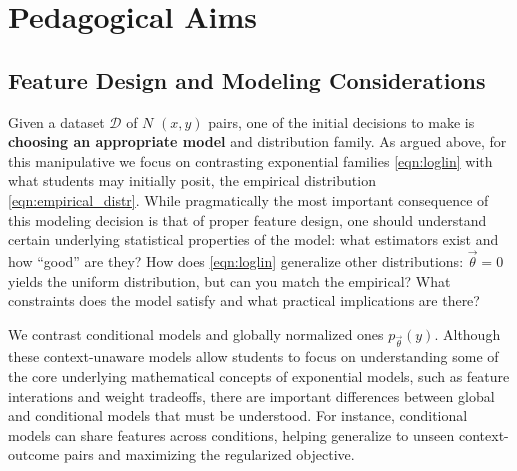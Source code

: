 \documentclass[11pt,letterpaper]{article}
\newcommand{\Data}[0]{\ensuremath{\mathcal{D}}}
\begin{document}

%
%
%


\section{Pedagogical Aims}\label{sec:aims}

\subsection{Feature Design and Modeling Considerations}

Given a dataset $\Data{}$ of $N$ $(x, y)$ pairs, one of the initial decisions 
to make is \textbf{choosing an appropriate model} and distribution family. 
As argued above, for this manipulative we focus on contrasting exponential families 
\eqref{eqn:loglin} with what students may initially posit, the empirical 
distribution \eqref{eqn:empirical_distr}. While pragmatically the most important 
consequence of this modeling decision is that of proper feature design, one should 
understand certain underlying statistical properties of the model: what estimators 
exist and how ``good'' are they? How does \eqref{eqn:loglin} generalize other 
distributions: $\vec{\theta} = 0$ yields the uniform distribution, but can you match 
the empirical? What constraints does the model satisfy and what practical implications
are there?
 
We contrast conditional models and globally normalized ones
$p_{\vec{\theta}}\left(y\right)$. Although
these context-unaware models allow students to focus on
understanding some of the core underlying mathematical concepts of
exponential models, such as feature interations and weight tradeoffs,
there are important differences between global and conditional models
that must be understood. For instance, conditional models can share 
features across conditions, helping generalize to unseen context-outcome 
pairs and maximizing the regularized objective.
\end{document}
